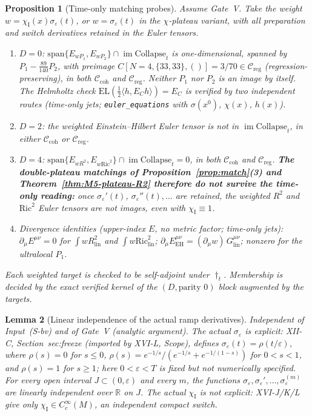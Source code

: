 \documentclass{article}
\newtheorem{proposition}{Proposition}
\newtheorem{lemma}[proposition]{Lemma}
\theoremstyle{remark}
\newcommand{\sigeps}{\sigma_\varepsilon}
\newcommand{\chiI}{\chi_{\mathrm I}}
\newcommand{\Ccoh}{\mathcal C_{\mathrm{coh}}}
\newcommand{\Creg}{\mathcal C_{\mathrm{reg}}}
\newcommand{\Coll}{\mathrm{Collapse}}
\begin{document}
\begin{proposition}[Time-only matching probes]
\label{prop:to-match}
Assume Gate~V.
Take the weight $w=\chiI(x)\sigeps(t)$, or $w=\sigeps(t)$ in the $\chi$-plateau variant, with all preparation and switch derivatives retained in the Euler tensors.
\begin{enumerate}
\item $D=0$: $\mathrm{span}\{E_{wP_1},E_{wP_2}\}\cap\operatorname{im}\Coll_t$ is one-dimensional, spanned by $P_1-\tfrac{89}{140}P_2$, with preimage $C[N=4,\{33,33\},()]=3/70\in\Creg$ (regression-preserving), in both $\Ccoh$ and $\Creg$.
Neither $P_1$ nor $P_2$ is an image by itself.
The Helmholtz check $\mathrm{EL}(\tfrac12\langle h,E_C h\rangle)=E_C$ is verified by two independent routes (time-only jets; \texttt{euler\_equations} with $\sigma(x^0)$, $\chi(x)$, $h(x)$).
\item $D=2$: the weighted Einstein--Hilbert Euler tensor is not in $\operatorname{im}\Coll_t$, in either $\Ccoh$ or $\Creg$.
\item $D=4$: $\mathrm{span}\{E_{wR^2},E_{w\mathrm{Ric}^2}\}\cap\operatorname{im}\Coll_t=0$, in both $\Ccoh$ and $\Creg$.
\textbf{The double-plateau matchings of Proposition~\ref{prop:match}(3) and Theorem~\ref{thm:M5-plateau-R2} therefore do not survive the time-only reading:} once $\sigeps'(t)$, $\sigeps''(t),\dots$ are retained, the weighted $R^2$ and $\mathrm{Ric}^2$ Euler tensors are not images, even with $\chiI\equiv1$.
\item Divergence identities (upper-index $E$, no metric factor; time-only jets): $\partial_\mu E^{\mu\nu}=0$ for $\int wR_{\mathrm{lin}}^2$ and $\int w\mathrm{Ric}_{\mathrm{lin}}^2$; $\partial_\mu E_{\mathrm{EH}}^{\mu\nu}=(\partial_\mu w)\,G_{\mathrm{lin}}^{\mu\nu}$; nonzero for the ultralocal $P_1$.
\end{enumerate}
Each weighted target is checked to be self-adjoint under $\dagger_t$.
Membership is decided by the exact verified kernel of the $(D,\text{parity }0)$ block augmented by the targets.
\end{proposition}

\begin{lemma}[Linear independence of the actual ramp derivatives]
\label{lem:to-indep}
Independent of Input~(S-bv) and of Gate~V (analytic argument).
The actual $\sigeps$ is explicit: XII-C, Section~sec:freeze (imported by XVI-L, Scope), defines $\sigeps(t)=\rho(t/\varepsilon)$, where
$\rho(s)=0$ for $s\le0$, $\rho(s)=e^{-1/s}/(e^{-1/s}+e^{-1/(1-s)})$ for $0<s<1$, and $\rho(s)=1$ for $s\ge1$; here $0<\varepsilon<T$ is fixed but not numerically specified.
For every open interval $J\subset(0,\varepsilon)$ and every $m$, the functions $\sigeps,\sigeps',\dots,\sigeps^{(m)}$ are linearly independent over $\mathbb R$ on $J$.
The actual $\chiI$ is \emph{not} explicit: XVI-J/K/L give only $\chiI\in C_c^\infty(M)$, an independent compact switch.
\end{lemma}
\end{document}
